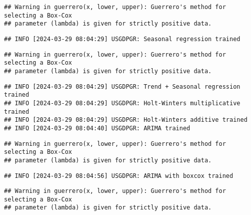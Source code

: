 \documentclass[
]{article}
\begin{document}
\begin{verbatim}
## Warning in guerrero(x, lower, upper): Guerrero's method for selecting a Box-Cox
## parameter (lambda) is given for strictly positive data.
\end{verbatim}

\begin{verbatim}
## INFO [2024-03-29 08:04:29] USGDPGR: Seasonal regression trained
\end{verbatim}

\begin{verbatim}
## Warning in guerrero(x, lower, upper): Guerrero's method for selecting a Box-Cox
## parameter (lambda) is given for strictly positive data.
\end{verbatim}

\begin{verbatim}
## INFO [2024-03-29 08:04:29] USGDPGR: Trend + Seasonal regression trained
## INFO [2024-03-29 08:04:29] USGDPGR: Holt-Winters multiplicative trained
## INFO [2024-03-29 08:04:29] USGDPGR: Holt-Winters additive trained
## INFO [2024-03-29 08:04:40] USGDPGR: ARIMA trained
\end{verbatim}

\begin{verbatim}
## Warning in guerrero(x, lower, upper): Guerrero's method for selecting a Box-Cox
## parameter (lambda) is given for strictly positive data.
\end{verbatim}

\begin{verbatim}
## INFO [2024-03-29 08:04:56] USGDPGR: ARIMA with boxcox trained
\end{verbatim}

\begin{verbatim}
## Warning in guerrero(x, lower, upper): Guerrero's method for selecting a Box-Cox
## parameter (lambda) is given for strictly positive data.
\end{verbatim}
\end{document}
